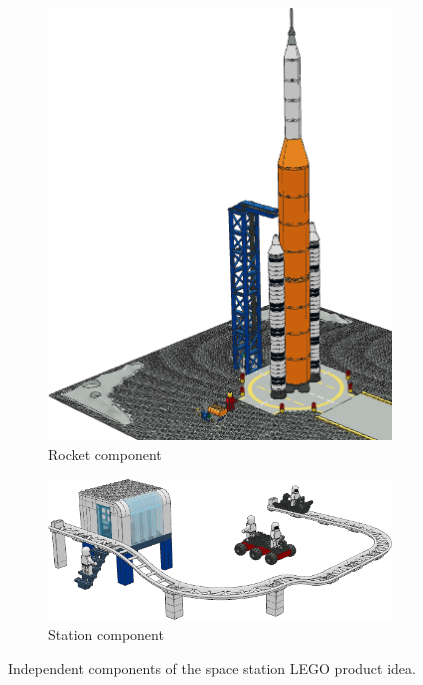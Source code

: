 \documentclass{PDS}
\begin{document}
\begin{figure}[htbp]
    \centering
    \begin{subfigure}[b]{0.2\textwidth}
        \includegraphics[width=\textwidth]{./figures/space_rocket.png}
        \caption{Rocket component}
    \end{subfigure}
    \hspace{0.05\textwidth}
    \begin{subfigure}[b]{0.6\textwidth}
        \includegraphics[width=\textwidth]{./figures/space_station.png}
        \caption{Station component}
    \end{subfigure}
    \caption{Independent components of the space station LEGO product idea.}
    \label{fig:school-sub}
\end{figure}
\end{document}
